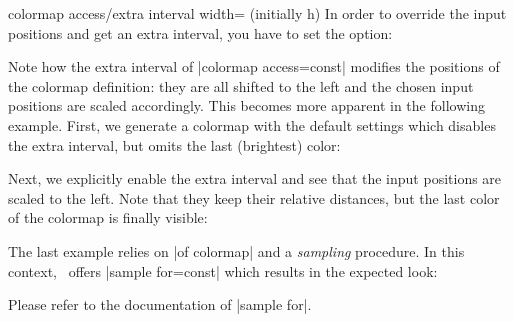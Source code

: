{\begin{pgfplotskey}{colormap access/extra interval width= (initially h)}
	In order to override the input positions and get an extra interval, you have to set the option:
\begin{codeexample}[]
\pgfplotscolorbardrawstandalone[
	colormap={example}{%
		color(0)=(blue)
		color(500)=(red)
		color(1000)=(black)
	},
	colorbar horizontal,
	colorbar style={xtick=data},
	colormap access/extra interval width=h,
	colormap access=const]
\end{codeexample}
	Note how the extra interval of |colormap access=const| modifies the positions of the colormap definition: they are all shifted to the left and the chosen input positions are scaled accordingly. This becomes more apparent in the following example.
	First, we generate a colormap with the default settings which disables the extra interval, but omits the last (brightest) color:

\begin{codeexample}[]
\pgfplotscolorbardrawstandalone[
	colormap={nonuniform}{
		of colormap={
			viridis,
			target pos={0,200,300,500,700,1000}
		}
	},
	colorbar horizontal,
	colormap access=const,
	colorbar style={xtick=data,font=\tiny,
		/pgf/number format/precision=0},
	colormap access=const]
\end{codeexample}

	Next, we explicitly enable the extra interval and see that the input positions are scaled to the left. Note that they keep their relative distances, but the last color of the colormap is finally visible:
\begin{codeexample}[]
\pgfplotscolorbardrawstandalone[
	colormap={nonuniform}{
		of colormap={
			viridis,
			target pos={0,200,300,500,700,1000}
		}
	},
	colorbar horizontal,
	colormap access=const,
	colormap access/extra interval width=h,
	colorbar style={xtick=data,font=\tiny,
		/pgf/number format/precision=0},
	colormap access=const]
\end{codeexample}

	The last example relies on |of colormap| and a \emph{sampling} procedure. In this context, \PGFPlots\ offers |sample for=const| which results in the expected look:
\begin{codeexample}[]
\pgfplotscolorbardrawstandalone[
	colormap={nonuniform}{
		of colormap={
			viridis,
			target pos={0,200,300,500,700,1000},
			sample for=const,
		}
	},
	colorbar horizontal,
	colormap access=const,
	colorbar style={xtick=data,font=\tiny,
		/pgf/number format/precision=0},
	colormap access=const]
\end{codeexample}
	Please refer to the documentation of |sample for|.
	

\end{pgfplotskey}}
